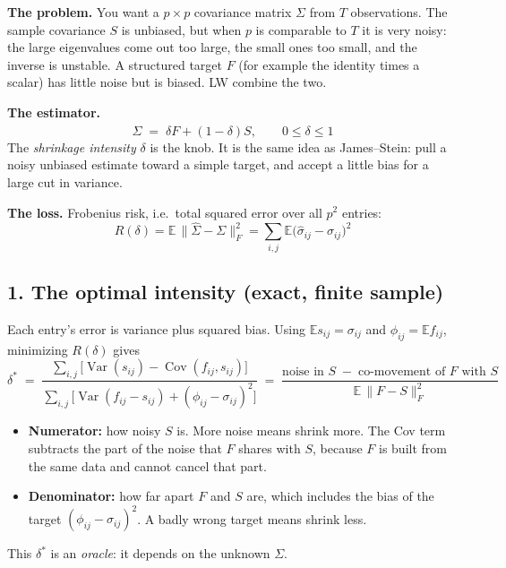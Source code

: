 \documentclass[12pt]{article}
\begin{document}
\textbf{The problem.} You want a $p\times p$ covariance matrix $\Sigma$ from $T$ observations.
The sample covariance $S$ is unbiased, but when $p$ is comparable to $T$ it is very noisy: the large
eigenvalues come out too large, the small ones too small, and the inverse is unstable. A structured
target $F$ (for example the identity times a scalar) has little noise but is biased. LW combine the two.

\textbf{The estimator.}
\[
\hat\Sigma \;=\; \delta F + (1-\delta) S, \qquad 0\le\delta\le 1
\]
The \emph{shrinkage intensity} $\delta$ is the knob. It is the same idea as James--Stein: pull a noisy
unbiased estimate toward a simple target, and accept a little bias for a large cut in variance.

\textbf{The loss.} Frobenius risk, i.e.\ total squared error over all $p^2$ entries:
\[
R(\delta) = \mathbb{E}\,\|\hat\Sigma - \Sigma\|_F^2 = \sum_{i,j}\mathbb{E}\big(\hat\sigma_{ij}-\sigma_{ij}\big)^2
\]

\subsection*{1. The optimal intensity (exact, finite sample)}
Each entry's error is variance plus squared bias. Using $\mathbb{E}s_{ij}=\sigma_{ij}$ and
$\phi_{ij}=\mathbb{E}f_{ij}$, minimizing $R(\delta)$ gives
\[
\delta^* \;=\; \frac{\displaystyle\sum_{i,j}\Big[\operatorname{Var}(s_{ij}) - \operatorname{Cov}(f_{ij},s_{ij})\Big]}
{\displaystyle\sum_{i,j}\Big[\operatorname{Var}(f_{ij}-s_{ij}) + (\phi_{ij}-\sigma_{ij})^2\Big]}
\;=\; \frac{\text{noise in } S \;-\; \text{co-movement of } F \text{ with } S}{\mathbb{E}\,\|F-S\|_F^2}
\]
\begin{itemize}
\item \textbf{Numerator:} how noisy $S$ is. More noise means shrink more. The Cov term subtracts the part
of the noise that $F$ shares with $S$, because $F$ is built from the same data and cannot cancel that part.
\item \textbf{Denominator:} how far apart $F$ and $S$ are, which includes the bias of the target
$(\phi_{ij}-\sigma_{ij})^2$. A badly wrong target means shrink less.
\end{itemize}
This $\delta^*$ is an \emph{oracle}: it depends on the unknown $\Sigma$.
\end{document}
